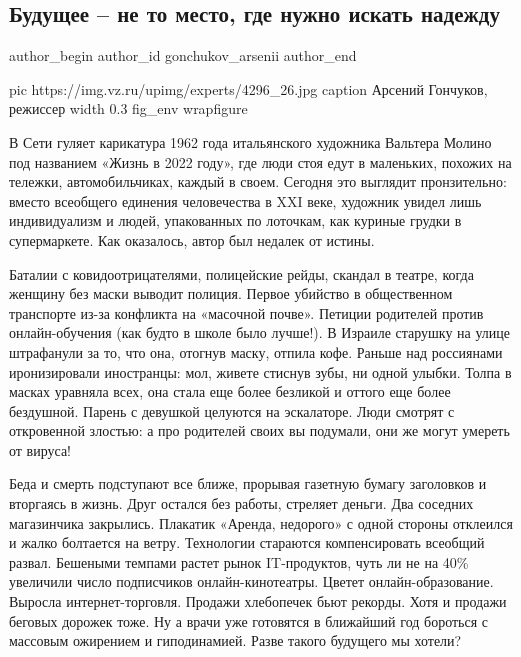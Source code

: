  
 
 
 
 
 
\subsection{Будущее – не то место, где нужно искать надежду}
\label{sec:17_12_2020.news.ru.vz.gonchukov_arsenii.1.buduschee_razmyshlenija}
\ifcmt
	author_begin
   author_id gonchukov_arsenii
	author_end
\fi
{}

\ifcmt
  pic https://img.vz.ru/upimg/experts/4296_26.jpg
  caption Арсений Гончуков, режиссер
  width 0.3
  fig_env wrapfigure
\fi

В Сети гуляет карикатура 1962 года итальянского художника Вальтера Молино под
названием «Жизнь в 2022 году», где люди стоя едут в маленьких, похожих на
тележки, автомобильчиках, каждый в своем. Сегодня это выглядит пронзительно:
вместо всеобщего единения человечества в XXI веке, художник увидел лишь
индивидуализм и людей, упакованных по лоточкам, как куриные грудки в
супермаркете. Как оказалось, автор был недалек от истины.

Баталии с ковидоотрицателями, полицейские рейды, скандал в театре, когда
женщину без маски выводит полиция. Первое убийство в общественном транспорте
из-за конфликта на «масочной почве». Петиции родителей против онлайн-обучения
(как будто в школе было лучше!). В Израиле старушку на улице штрафанули за то,
что она, отогнув маску, отпила кофе. Раньше над россиянами иронизировали
иностранцы: мол, живете стиснув зубы, ни одной улыбки. Толпа в масках уравняла
всех, она стала еще более безликой и оттого еще более бездушной. Парень с
девушкой целуются на эскалаторе. Люди смотрят с откровенной злостью: а про
родителей своих вы подумали, они же могут умереть от вируса!

Беда и смерть подступают все ближе, прорывая газетную бумагу заголовков и
вторгаясь в жизнь. Друг остался без работы, стреляет деньги. Два соседних
магазинчика закрылись. Плакатик «Аренда, недорого» с одной стороны отклеился и
жалко болтается на ветру. Технологии стараются компенсировать всеобщий развал.
Бешеными темпами растет рынок IT-продуктов, чуть ли не на 40\% увеличили число
подписчиков онлайн-кинотеатры. Цветет онлайн-образование. Выросла
интернет-торговля. Продажи хлебопечек бьют рекорды. Хотя и продажи беговых
дорожек тоже. Ну а врачи уже готовятся в ближайший год бороться с массовым
ожирением и гиподинамией. Разве такого будущего мы хотели? 

